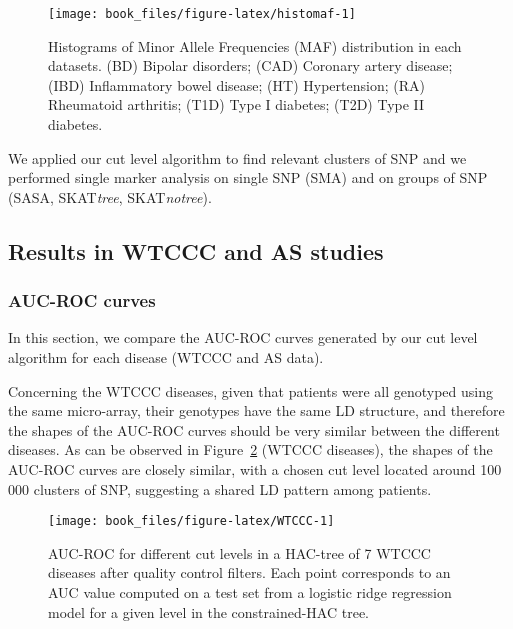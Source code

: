 \documentclass[]{book}
\begin{document}
\begin{figure}

{\centering \texttt{[image: book\_files/figure-latex/histomaf-1]} 

}

\caption{Histograms of Minor Allele Frequencies (MAF) distribution in each datasets. (BD) Bipolar disorders; (CAD) Coronary artery disease; (IBD) Inflammatory bowel disease; (HT) Hypertension; (RA) Rheumatoid arthritis; (T1D) Type I diabetes; (T2D) Type II diabetes.}\label{fig:histomaf}
\end{figure}

We applied our cut level algorithm to find relevant clusters of SNP and
we performed single marker analysis on single SNP (SMA) and on groups of
SNP (SASA, SKAT\emph{tree}, SKAT\emph{notree}).

\hypertarget{realdata}{%
\subsection{Results in WTCCC and AS studies}\label{realdata}}

\hypertarget{auc-roc-curves}{%
\subsubsection{AUC-ROC curves}\label{auc-roc-curves}}

In this section, we compare the AUC-ROC curves generated by our cut
level algorithm for each disease (WTCCC and AS data).

Concerning the WTCCC diseases, given that patients were all genotyped
using the same micro-array, their genotypes have the same LD structure,
and therefore the shapes of the AUC-ROC curves should be very similar
between the different diseases. As can be observed in
Figure~\ref{fig:WTCCC} (WTCCC diseases), the shapes of the AUC-ROC curves
are closely similar, with a chosen cut level located around 100 000
clusters of SNP, suggesting a shared LD pattern among patients.



\begin{figure}

{\centering \texttt{[image: book\_files/figure-latex/WTCCC-1]} 

}

\caption{AUC-ROC for different cut levels in a HAC-tree of 7 WTCCC diseases after quality control filters. Each point corresponds to an AUC value computed on a test set from a logistic ridge regression model for a given level in the constrained-HAC tree.}\label{fig:WTCCC}
\end{figure}
\end{document}
